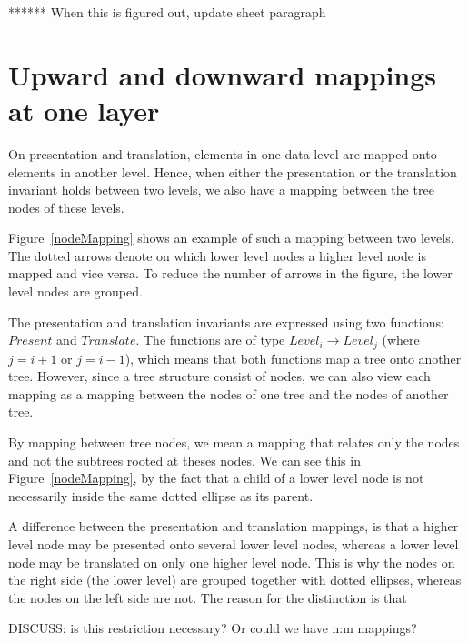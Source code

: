 ****** When this is figured out, update sheet paragraph
\ec


%																
\section{Upward and downward mappings at one layer}\label{mappingsInLayer}


On presentation and translation, elements in one data level are mapped onto elements in another level. Hence, when either the presentation or the translation invariant holds between two levels, we also have a mapping between the tree nodes of these levels. 

Figure~\ref{nodeMapping} shows an example of such a mapping between two levels. The dotted arrows denote on which lower level nodes a higher level node is mapped and vice versa. To reduce the number of arrows in the figure, the lower level nodes are grouped.

\bc The presentation and translation invariants are expressed using two functions: $Present$ and $Translate$. The functions are of type $Level_i \rightarrow Level_j$ (where $j = i+1$ or
$j = i-1$), which means that both functions map a tree onto another tree. However, since a tree structure consist of nodes, we can also view each mapping as a mapping between the nodes of one tree and the nodes of another tree.  
\ec

By mapping between tree nodes, we mean a mapping that relates only the nodes and not the subtrees rooted at theses nodes. We can see this in Figure~\ref{nodeMapping}, by the fact that a child of a lower level node is not necessarily inside the same dotted ellipse as its parent. 


A difference between the presentation and translation mappings, is that a higher level node may be presented onto several lower level nodes, whereas a lower level node may be translated on only one higher level node. This is why the nodes on the right side (the lower level) are grouped together with dotted ellipses, whereas the nodes on the left side are not. The reason for the distinction is that 
\toHere     %

DISCUSS: is this restriction necessary? Or could we have n:m mappings?

